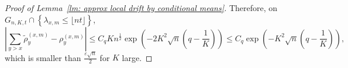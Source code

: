 \documentclass[EJP]{ejpecp} %
\begin{document}
\begin{proof}[Proof of Lemma~\ref{lm: approx local drift by conditional means}]
	Therefore, on $G_{n,K,t} \cap \left\{ \lambda_{x,m} \leq\lfloor nt \rfloor \right\}$,
	\begin{equation}\label{eq: difference of cond means}
		\left| \sum_{y > x} \tilde\rho_y^{(x,m)} - \rho_y^{(x,m)} \right| \le C_q K n^{\frac{1}{2}} \exp\left( - 2K^2 \sqrt{n}(q - \frac{1}{K}) \right) \leq  C_q\exp\left( - K^2 \sqrt{n}(q - \frac{1}{K}) \right), 
	\end{equation}
	which is smaller than $\frac{\varepsilon \sqrt{n}}{2}$ for $K$ large.
	
	


\end{proof}
\end{document}
